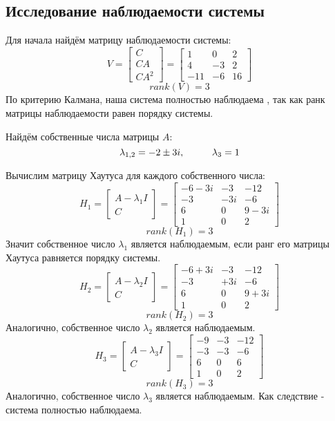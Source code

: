 \subsection{Исследование наблюдаемости системы}
Для начала найдём матрицу наблюдаемости системы:
$$
V = \begin{bmatrix}
    C \\ CA \\ CA^2
\end{bmatrix} = \begin{bmatrix}
                1   &	0	&  2 \\
                4   &   -3  &  2 \\
                -11  &    -6  &  16
            \end{bmatrix}
$$
$$
  rank(V) = 3
$$
По критерию Калмана, наша система полностью наблюдаема , так как ранк матрицы наблюдаемости равен порядку системы.

Найдём собственные числа матрицы $A$:
$$
    \lambda_{1,2} = -2 \pm 3i, \hspace*{1cm} \lambda_3 = 1 
$$

Вычислим матрицу Хаутуса для каждого собственного числа:
$$
    H_1 = \begin{bmatrix}
          A - \lambda_1 I \\ C   
          \end{bmatrix} = 
    \begin{bmatrix}
    -6-3i & -3 & -12  \\  
      -3 & -3i & -6  \\  
     6 & 0 & 9-3i \\ 
      1 & 0 & 2
    \end{bmatrix}
$$
$$
rank(H_1) = 3
$$
Значит собственное число $\lambda_1$ является наблюдаемым, если ранг его матрицы Хаутуса равняется порядку системы.
$$
    H_2 = \begin{bmatrix}
          A - \lambda_2 I \\ C
          \end{bmatrix} = 
        \begin{bmatrix}
            -6+3i & -3 & -12  \\  
              -3 & +3i & -6  \\  
             6 & 0 & 9+3i \\ 
              1 & 0 & 2
        \end{bmatrix}
$$
$$
rank(H_2) = 3
$$
Аналогично, собственное число $\lambda_2$ является наблюдаемым.
$$
    H_3 = \begin{bmatrix}
          A - \lambda_3 I \\ C   
          \end{bmatrix} = 
        \begin{bmatrix}
            -9 & -3 & -12  \\  
              -3 & -3 & -6  \\  
             6 & 0 & 6 \\ 
              1 & 0 & 2
        \end{bmatrix}
$$
$$
rank(H_3) = 3
$$
Аналогично, собственное число $\lambda_3$ является наблюдаемым. Как следствие - система полностью наблюдаема.

